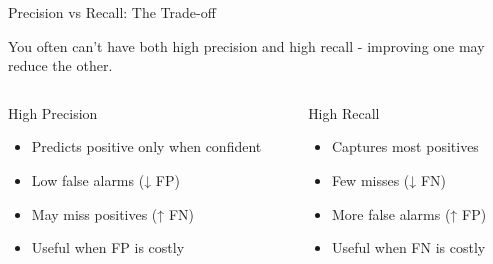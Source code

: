 \documentclass[usenames,dvipsnames]{beamer}
\begin{document}


\begin{frame}{Precision vs Recall: The Trade-off}
\footnotesize

You often can't have both high precision and high recall - improving one may reduce the other.


\begin{columns}[t]
\begin{column}{0.48\textwidth}
	\begin{definitionbox}{High Precision}
	\begin{itemize}
		\item Predicts positive only when confident
		\item Low false alarms (↓ FP)
		\item May miss positives (↑ FN)
		\item Useful when FP is costly
	\end{itemize}
	\end{definitionbox}
\end{column}

\begin{column}{0.48\textwidth}
	\begin{definitionbox}{High Recall}
	\begin{itemize}
		\item Captures most positives
		\item Few misses (↓ FN)
		\item More false alarms (↑ FP)
		\item Useful when FN is costly
	\end{itemize}
	\end{definitionbox}
\end{column}
\end{columns}

\vspace{0.2cm}

\end{frame}
\end{document}
